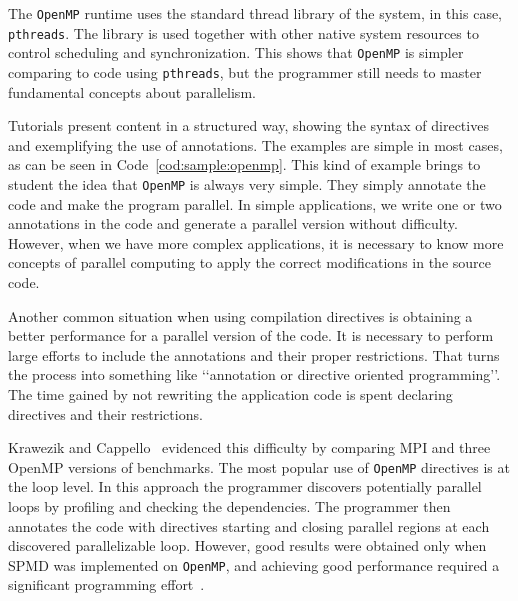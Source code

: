 The \texttt{OpenMP} runtime uses the standard thread library of the system, in this case, \texttt{pthreads}. The library is used together with other native system resources to control scheduling and synchronization. This shows that \texttt{OpenMP} is simpler comparing to code using \texttt{pthreads}, but the programmer still needs to master fundamental concepts about parallelism.

Tutorials present content in a structured way, showing the syntax of directives and exemplifying the use of annotations. The examples are simple in most cases, as can be seen in Code~\ref{cod:sample:openmp}. This kind of example brings to student the idea that \texttt{OpenMP} is always very simple. They simply annotate the code and make the program parallel.
In simple applications, we write one or two annotations in the code and generate a parallel version without difficulty. However, when we have more complex applications, it is necessary to know more concepts of parallel computing to apply the correct modifications in the source code. 

Another common situation when using compilation directives is obtaining a better performance for a parallel version of the code. It is necessary to perform large efforts to include the annotations and their proper restrictions. That turns the process into something like \lq\lq{}annotation or directive oriented programming\rq\rq. The time gained by not rewriting the application code is spent declaring directives and their restrictions.

Krawezik and Cappello~\cite{CPE:CPE905} evidenced this difficulty by comparing MPI and three OpenMP versions of benchmarks. The most popular use of \texttt{OpenMP} directives is at the loop level. In this approach the programmer discovers potentially parallel loops by profiling and checking the dependencies. The programmer then annotates the code with directives starting and closing parallel regions at each discovered parallelizable loop. However, good results were obtained only when SPMD was implemented on \texttt{OpenMP}, and achieving good performance required a significant programming effort~\cite{CPE:CPE905}.
